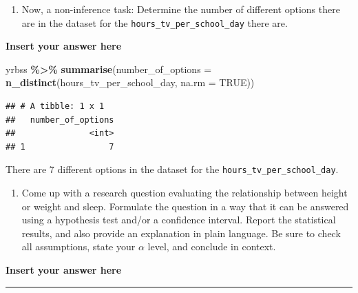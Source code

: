 \documentclass[
]{article}
\newenvironment{Shaded}{\begin{snugshade}}{\end{snugshade}}
\newcommand{\AttributeTok}[1]{\textcolor[rgb]{0.13,0.29,0.53}{#1}}
\newcommand{\ConstantTok}[1]{\textcolor[rgb]{0.56,0.35,0.01}{#1}}
\newcommand{\FunctionTok}[1]{\textcolor[rgb]{0.13,0.29,0.53}{\textbf{#1}}}
\newcommand{\NormalTok}[1]{#1}
\newcommand{\SpecialCharTok}[1]{\textcolor[rgb]{0.81,0.36,0.00}{\textbf{#1}}}
\providecommand{\tightlist}{%
  \setlength{\itemsep}{0pt}\setlength{\parskip}{0pt}}
\begin{document}
\begin{enumerate}
\def\labelenumi{\arabic{enumi}.}
\setcounter{enumi}{10}
\tightlist
\item
  Now, a non-inference task: Determine the number of different options
  there are in the dataset for the \texttt{hours\_tv\_per\_school\_day}
  there are.
\end{enumerate}

\textbf{Insert your answer here}

\begin{Shaded}
\begin{Highlighting}[]
\NormalTok{yrbss }\SpecialCharTok{\%\textgreater{}\%}
  \FunctionTok{summarise}\NormalTok{(}\AttributeTok{number\_of\_options =} \FunctionTok{n\_distinct}\NormalTok{(hours\_tv\_per\_school\_day, }\AttributeTok{na.rm =} \ConstantTok{TRUE}\NormalTok{))}
\end{Highlighting}
\end{Shaded}

\begin{verbatim}
## # A tibble: 1 x 1
##   number_of_options
##               <int>
## 1                 7
\end{verbatim}

There are 7 different options in the dataset for the
\texttt{hours\_tv\_per\_school\_day}.

\begin{enumerate}
\def\labelenumi{\arabic{enumi}.}
\setcounter{enumi}{11}
\tightlist
\item
  Come up with a research question evaluating the relationship between
  height or weight and sleep. Formulate the question in a way that it
  can be answered using a hypothesis test and/or a confidence interval.
  Report the statistical results, and also provide an explanation in
  plain language. Be sure to check all assumptions, state your
  \(\alpha\) level, and conclude in context.
\end{enumerate}

\textbf{Insert your answer here}

\begin{center}\rule{0.5\linewidth}{0.5pt}\end{center}
\end{document}
